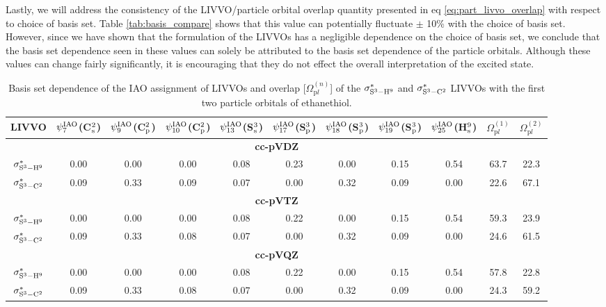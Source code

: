 \documentclass{article}
\begin{document}
Lastly, we will address the consistency of the LIVVO/particle orbital overlap quantity presented in eq \ref{eq:part_livvo_overlap} with respect to choice of basis set. Table \ref{tab:basis_compare} shows that this value can potentially fluctuate $\pm$ 10\% with the choice of basis set. However, since we have shown that the formulation of the LIVVOs has a negligible dependence on the choice of basis set, we conclude that the basis set dependence seen in these values can solely be attributed to the basis set dependence of the particle orbitals.
Although these values can change fairly significantly, it is encouraging that they do not effect the overall interpretation of the excited state.

\begin{table*}[!t]
\centering
\footnotesize
\caption{Basis set dependence of the IAO assignment of LIVVOs and overlap [$\Omega_{\mathrm{p}l}^{(n)}$] of the $\sigma^*_{\rm S^3-H^9}$ and $\sigma^*_{\rm S^3-C^2}$ LIVVOs  with the first two particle orbitals of ethanethiol.}
\begin{tabular}{@{\extracolsep{6pt}}ccccccccccc@{}}
\toprule
LIVVO & $\psi^{\rm IAO}_{7}$(C$^2_{\rm s}$)& $\psi^{\rm IAO}_{9}$(C$^2_{\rm p}$)& $\psi^{\rm IAO}_{10}$(C$^2_{\rm p}$)& $\psi^{\rm IAO}_{13}$(S$^3_{\rm s}$) & $\psi^{\rm IAO}_{17}$(S$^3_{\rm p}$) & $\psi^{\rm IAO}_{18}$(S$^3_{\rm p}$) & $\psi^{\rm IAO}_{19}$(S$^3_{\rm p}$) &$\psi^{\rm IAO}_{25}$(H$^9_{\rm s}$) & $\Omega_{\mathrm{p}l}^{(1)}$ & $\Omega_{\mathrm{p}l}^{(2)}$ \\
\midrule
\multicolumn{11}{c}{\bf{cc-pVDZ}} \\
$\sigma^*_{\rm S^3-H^9}$ & 0.00 & 0.00 & 0.00 & 0.08 & 0.23 & 0.00 & 0.15 & 0.54 & 63.7 & 22.3 \\
$\sigma^*_{\rm S^3-C^2}$ & 0.09 & 0.33 & 0.09 & 0.07 & 0.00 & 0.32 & 0.09 & 0.00 & 22.6 & 67.1\\
\multicolumn{11}{c}{\bf{cc-pVTZ}} \\
$\sigma^*_{\rm S^3-H^9}$ & 0.00 & 0.00 & 0.00 & 0.08 & 0.22 & 0.00 & 0.15 & 0.54 & 59.3 & 23.9 \\
$\sigma^*_{\rm S^3-C^2}$ & 0.09 & 0.33 & 0.08 & 0.07 & 0.00 & 0.32 & 0.09 & 0.00 & 24.6 & 61.5\\
\multicolumn{11}{c}{\bf{cc-pVQZ}} \\
$\sigma^*_{\rm S^3-H^9} $& 0.00 & 0.00 & 0.00 & 0.08 & 0.22 & 0.00 & 0.15 & 0.54 & 57.8 &  22.8\\
$\sigma^*_{\rm S^3-C^2} $& 0.09 & 0.33 & 0.08 & 0.07 & 0.00 & 0.32 & 0.09 & 0.00 & 24.3 & 59.2\\

\end{tabular}
\end{table*}
\end{document}
